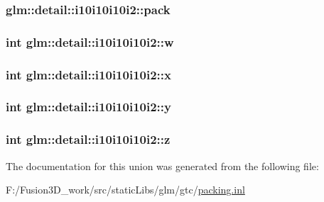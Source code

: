 \subsubsection[{pack}]{ glm\+::detail\+::i10i10i10i2\+::pack}\label{unionglm_1_1detail_1_1i10i10i10i2_a24e2dc324c86589d568dc330904c859a}
\hypertarget{unionglm_1_1detail_1_1i10i10i10i2_a20c12acbdb874a476b158164acd17abd}{}
\subsubsection[{w}]{\setlength{\rightskip}{0pt plus 5cm}int glm\+::detail\+::i10i10i10i2\+::w}\label{unionglm_1_1detail_1_1i10i10i10i2_a20c12acbdb874a476b158164acd17abd}
\hypertarget{unionglm_1_1detail_1_1i10i10i10i2_a290d519ee2feaba6ae4b5244d5d90e7b}{}
\subsubsection[{x}]{\setlength{\rightskip}{0pt plus 5cm}int glm\+::detail\+::i10i10i10i2\+::x}\label{unionglm_1_1detail_1_1i10i10i10i2_a290d519ee2feaba6ae4b5244d5d90e7b}
\hypertarget{unionglm_1_1detail_1_1i10i10i10i2_ae76bb89adeb66d1ee5bb2b265e87fc1b}{}
\subsubsection[{y}]{\setlength{\rightskip}{0pt plus 5cm}int glm\+::detail\+::i10i10i10i2\+::y}\label{unionglm_1_1detail_1_1i10i10i10i2_ae76bb89adeb66d1ee5bb2b265e87fc1b}
\hypertarget{unionglm_1_1detail_1_1i10i10i10i2_a95398090414de32eaaf9cb3c3bd3fa48}{}
\subsubsection[{z}]{\setlength{\rightskip}{0pt plus 5cm}int glm\+::detail\+::i10i10i10i2\+::z}\label{unionglm_1_1detail_1_1i10i10i10i2_a95398090414de32eaaf9cb3c3bd3fa48}


The documentation for this union was generated from the following file\+:\begin{DoxyCompactItemize}
\item 
F\+:/\+Fusion3\+D\+\_\+work/src/static\+Libs/glm/gtc/\hyperlink{packing_8inl}{packing.\+inl}\end{DoxyCompactItemize}
